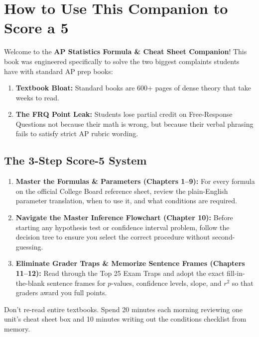 \chapter*{How to Use This Companion to Score a 5}

Welcome to the \textbf{AP Statistics Formula \& Cheat Sheet Companion}! This book was engineered specifically to solve the two biggest complaints students have with standard AP prep books:
\begin{enumerate}
    \item \textbf{Textbook Bloat:} Standard books are 600+ pages of dense theory that take weeks to read.
    \item \textbf{The FRQ Point Leak:} Students lose partial credit on Free-Response Questions not because their math is wrong, but because their verbal phrasing fails to satisfy strict AP rubric wording.
\end{enumerate}

\section*{The 3-Step Score-5 System}

\begin{enumerate}[label=\textbf{Step \arabic*:}]
    \item \textbf{Master the Formulas \& Parameters (Chapters 1--9):} For every formula on the official College Board reference sheet, review the plain-English parameter translation, when to use it, and what conditions are required.
    \item \textbf{Navigate the Master Inference Flowchart (Chapter 10):} Before starting any hypothesis test or confidence interval problem, follow the decision tree to ensure you select the correct procedure without second-guessing.
    \item \textbf{Eliminate Grader Traps \& Memorize Sentence Frames (Chapters 11--12):} Read through the Top 25 Exam Traps and adopt the exact fill-in-the-blank sentence frames for $p$-values, confidence levels, slope, and $r^2$ so that graders award you full points.
\end{enumerate}

\begin{tipbox}
Don't re-read entire textbooks. Spend 20 minutes each morning reviewing one unit's cheat sheet box and 10 minutes writing out the conditions checklist from memory.
\end{tipbox}

